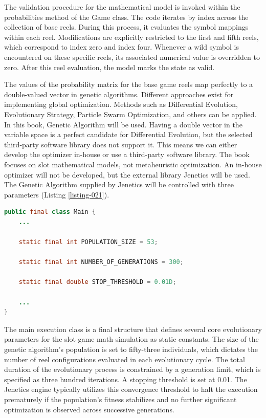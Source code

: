 \documentclass[12pt,twoside,openany]{book}
\begin{document}
The validation procedure for the mathematical model is invoked within the probabilities method of the Game class. The code iterates by index across the collection of base reels. During this process, it evaluates the symbol mappings within each reel. Modifications are explicitly restricted to the first and fifth reels, which correspond to index zero and index four. Whenever a wild symbol is encountered on these specific reels, its associated numerical value is overridden to zero. After this reel evaluation, the model marks the state as valid.

The values of the probability matrix for the base game reels map perfectly to a double-valued vector in genetic algorithms. Different approaches exist for implementing global optimization. Methods such as Differential Evolution, Evolutionary Strategy, Particle Swarm Optimization, and others can be applied. In this book, Genetic Algorithm will be used. Having a double vector in the variable space is a perfect candidate for Differential Evolution, but the selected third-party software library does not support it. This means we can either develop the optimizer in-house or use a third-party software library. The book focuses on slot mathematical models, not metaheuristic optimization. An in-house optimizer will not be developed, but the external library Jenetics will be used. The Genetic Algorithm supplied by Jenetics will be controlled with three parameters (Listing \ref{listing-021}).

\begin{lstlisting}[language=Java, caption={Optimization parameters}, label=listing-021]
public final class Main {
    ...

    static final int POPULATION_SIZE = 53;

    static final int NUMBER_OF_GENERATIONS = 300;

    static final double STOP_THRESHOLD = 0.01D;

    ...
}
\end{lstlisting}

The main execution class is a final structure that defines several core evolutionary parameters for the slot game math simulation as static constants. The size of the genetic algorithm's population is set to fifty-three individuals, which dictates the number of reel configurations evaluated in each evolutionary cycle. The total duration of the evolutionary process is constrained by a generation limit, which is specified as three hundred iterations. A stopping threshold is set at 0.01. The Jenetics engine typically utilizes this convergence threshold to halt the execution prematurely if the population's fitness stabilizes and no further significant optimization is observed across successive generations.
\end{document}
